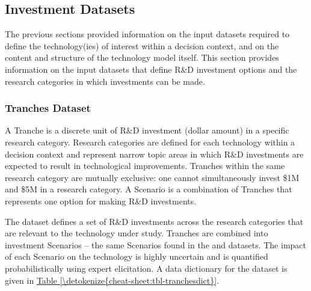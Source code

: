 \documentclass[letterpaper,10pt,english]{sphinxmanual}
\begin{document}
\subsection{Investment Datasets}
\label{\detokenize{cheat-sheet:investment-datasets}}
\sphinxAtStartPar
The previous sections provided information on the input datasets required to define the technology(ies) of interest within a decision context, and on the content and structure of the technology model itself. This section provides information on the input datasets that define R\&D investment options and the research categories in which investments can be made.


\subsubsection{Tranches Dataset}
\label{\detokenize{cheat-sheet:tranches-dataset}}
\sphinxAtStartPar
A Tranche is a discrete unit of R\&D investment (dollar amount) in a specific research category. Research categories are defined for each technology within a decision context and represent narrow topic areas in which R\&D investments are expected to result in technological improvements. Tranches within the same research category are mutually exclusive: one cannot simultaneously invest \$1M and \$5M in a research category. A Scenario is a combination of Tranches that represents one option for making R\&D investments.

\sphinxAtStartPar
The  dataset defines a set of R\&D investments across the research categories that are relevant to the technology under study. Tranches are combined into investment Scenarios – the same Scenarios found in the  and  datasets. The impact of each Scenario on the technology is highly uncertain and is quantified probabilistically using expert elicitation. A data dictionary for the  dataset is given in \hyperref[\detokenize{cheat-sheet:tbl-tranchesdict}]{Table \ref{\detokenize{cheat-sheet:tbl-tranchesdict}}}.
\end{document}
